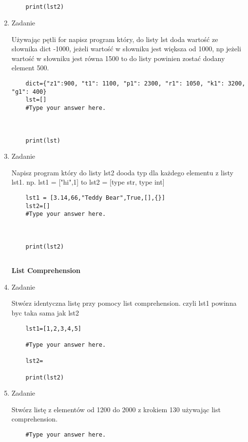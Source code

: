 \documentclass[11pt]{article}
\begin{document}
\begin{enumerate}
\begin{lstlisting}
	
	
	print(lst2)
\end{lstlisting}

\item 
\begin{Large}
	Zadanie
\end{Large}
\par
Używając pętli for napisz program który, do listy lst doda wartość ze słownika dict -1000, jeżeli wartość w słowniku jest większa od 1000, np jeżeli wartość w słowniku jest równa 1500 to do listy powinien zostać dodany element 500.
\begin{lstlisting}
	dict={"z1":900, "t1": 1100, "p1": 2300, "r1": 1050, "k1": 3200, "g1": 400}
	lst=[]
	#Type your answer here.
	
	
	
	print(lst)
\end{lstlisting}

\item 
\begin{Large}
	Zadanie
\end{Large}
\par
Napisz program który do listy lst2 dooda typ dla każdego elementu z listy lst1. np. lst1 = ["hi",1] to lst2 = [type str, type int]

\begin{lstlisting}
	lst1 = [3.14,66,"Teddy Bear",True,[],{}]
	lst2=[]
	#Type your answer here.
	
	
	
	print(lst2)
	
\end{lstlisting}
\medskip
\begin{Large}
	\textbf{List Comprehension}
\end{Large}
\item 
\begin{Large}
	Zadanie
\end{Large}
\par
Stwórz identyczna listę przy pomocy list comprehension. czyli lst1 powinna byc taka sama jak lst2
\begin{lstlisting}
	lst1=[1,2,3,4,5]
	
	#Type your answer here.
	
	lst2=
	
	print(lst2)
\end{lstlisting}

\item 
\begin{Large}
	Zadanie
\end{Large}
\par
Stwórz listę z elementów od 1200 do 2000 z krokiem 130 używając list comprehension.
\begin{lstlisting}
	#Type your answer here.
	

\end{lstlisting}
\end{enumerate}
\end{document}

